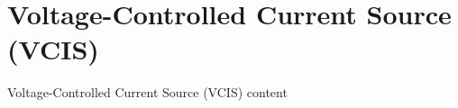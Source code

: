 \section{Voltage-Controlled Current Source (VCIS)}
\begin{frame}{Voltage-Controlled Current Source (VCIS)}
	content
\end{frame}